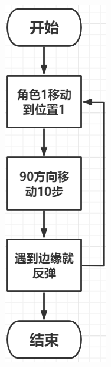\documentclass[10pt, a4paper]{article}
\begin{document}
\begin{enumerate}
\begin{figure}[htbp]
\begin{minipage}[t]{.07\textwidth}
                \includegraphics[width=\textwidth]{12.png}

\end{minipage}
\end{figure}
\end{enumerate}
\end{document}
